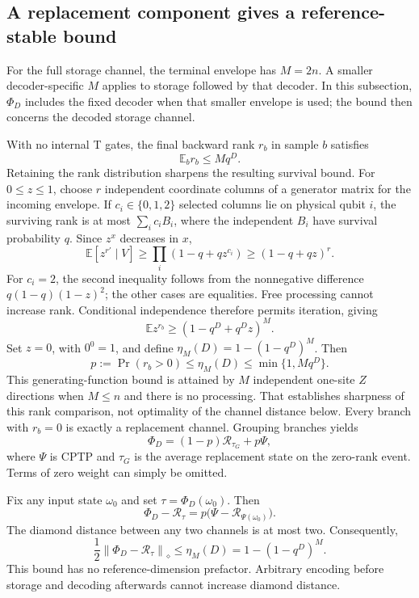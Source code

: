 \documentclass[11pt,a4paper]{article}
\numberwithin{equation}{section}
\theoremstyle{remark}\newtheorem*{remark}{Interpretation}
\newcommand{\E}{\mathbb E}
\newcommand{\R}{\mathcal R}
\newcommand{\norm}[1]{\left\lVert#1\right\rVert}
\begin{document}
\subsection{A replacement component gives a reference-stable bound}
For the full storage channel, the terminal envelope has $M=2n$. A smaller decoder-specific $M$ applies to storage followed by that decoder. In this subsection, $\Phi_D$ includes the fixed decoder when that smaller envelope is used; the bound then concerns the decoded storage channel.

With no internal T gates, the final backward rank $r_b$ in sample $b$ satisfies
\begin{equation}
\E_b r_b\le Mq^D.
\end{equation}
Retaining the rank distribution sharpens the resulting survival bound. For $0\le z\le1$, choose $r$ independent coordinate columns of a generator matrix for the incoming envelope. If $c_i\in\{0,1,2\}$ selected columns lie on physical qubit $i$, the surviving rank is at most $\sum_i c_i B_i$, where the independent $B_i$ have survival probability $q$. Since $z^x$ decreases in $x$,
\[
\E[z^{r'}\mid V]\ge\prod_i(1-q+qz^{c_i})
\ge(1-q+qz)^r.
\]
For $c_i=2$, the second inequality follows from the nonnegative difference $q(1-q)(1-z)^2$; the other cases are equalities. Free processing cannot increase rank. Conditional independence therefore permits iteration, giving
\[
\E z^{r_b}\ge(1-q^D+q^Dz)^M.
\]
Set $z=0$, with $0^0=1$, and define $\eta_M(D)=1-(1-q^D)^M$. Then
\begin{equation}
p:=\Pr(r_b>0)\le\eta_M(D)\le\min\{1,Mq^D\}.
\end{equation}
This generating-function bound is attained by $M$ independent one-site $Z$ directions when $M\le n$ and there is no processing. That establishes sharpness of this rank comparison, not optimality of the channel distance below.
Every branch with $r_b=0$ is exactly a replacement channel. Grouping branches yields
\begin{equation}
\Phi_D=(1-p)\R_{\tau_G}+p\Psi,
\end{equation}
where $\Psi$ is CPTP and $\tau_G$ is the average replacement state on the zero-rank event. Terms of zero weight can simply be omitted.

Fix any input state $\omega_0$ and set $\tau=\Phi_D(\omega_0)$. Then
\begin{equation}
\Phi_D-\R_\tau
=p\bigl(\Psi-\R_{\Psi(\omega_0)}\bigr).
\end{equation}
The diamond distance between any two channels is at most two. Consequently,
\begin{equation}
\boxed{\frac12\norm{\Phi_D-\R_\tau}_\diamond
\le\eta_M(D)=1-(1-q^D)^M.}
\label{eq:forget}
\end{equation}
This bound has no reference-dimension prefactor. Arbitrary encoding before storage and decoding afterwards cannot increase diamond distance.
\end{document}
